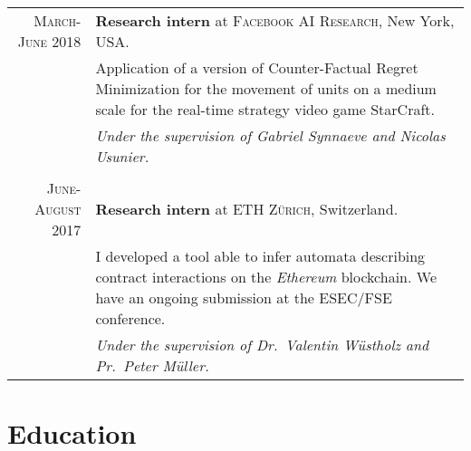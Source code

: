 \documentclass[a4paper,10pt]{article} %
\begin{document}
\begin{tabular}{r|p{10.5cm}}
\textsc{March-June 2018} & \textbf{Research intern} at \textsc{Facebook AI Research}, New York, USA. \\ 
& {Application of a version of Counter-Factual Regret Minimization for the movement of units on a medium scale for the real-time strategy video game StarCraft.} \\ & \emph{Under the supervision of Gabriel Synnaeve and Nicolas Usunier.}\\ \\
\textsc{June-August 2017} & \textbf{Research intern} at \textsc{ETH Zürich}, Switzerland. \\ 
& {I developed a tool able to infer automata describing contract interactions on the \emph{Ethereum} blockchain. We have an ongoing submission at the ESEC/FSE conference.} \\ & \emph{Under the supervision of Dr.\ Valentin Wüstholz and Pr.\ Peter Müller.}\\




\end{tabular}


\section{Education}
\end{document}
